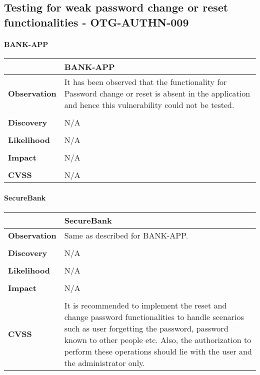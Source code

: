 \subsection{Testing for weak password change or reset functionalities - OTG-AUTHN-009}

\paragraph{BANK-APP} \mbox{}
\begin{longtable*}{p{.20\textwidth} | p{.80\textwidth}}
    \hline
    & \textbf{BANK-APP} \\
    \hline
    \textbf{Observation} &
   It has been observed that the functionality for Password change or reset is absent in the application and hence this vulnerability could not be tested.
    \\\\
    \textbf{Discovery} &
      N/A
    \\\\
    \textbf{Likelihood} &
        N/A
    \\\\
    \textbf{Impact} &
       N/A
    \\\\
    \textbf{CVSS} &
     N/A
    \\
    \hline
\end{longtable*}
\paragraph{SecureBank} \mbox{}
\begin{longtable*}{p{.20\textwidth} | p{.80\textwidth}}
    \hline
    & \textbf{SecureBank} \\
    \hline
    \textbf{Observation} &
       Same as described for BANK-APP. 
    \\\\
    \textbf{Discovery} &
    N/A
    \\\\
    \textbf{Likelihood} &
     N/A
    \\\\
    \textbf{Impact} &
      N/A
    \\\\
    \textbf{CVSS} &
    It is recommended to implement the reset and change password functionalities to handle scenarios such as user forgetting the password, password known to other people etc. Also, the authorization to perform these operations should lie with the user and the administrator only.
    \\
    \hline
\end{longtable*}
\clearpage